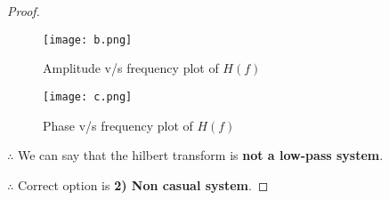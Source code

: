 \documentclass[journal,12pt,twocolumn]{IEEEtran}
\begin{document}
\begin{proof}
\begin{enumerate}
  \begin{figure}[!htp]
\centering
 \texttt{[image: b.png]}
 \caption{Amplitude v/s frequency plot of $H(f)$}
  \label{figx3}
 \end{figure}
 
  \begin{figure}[!htp]
\centering
 \texttt{[image: c.png]}
 \caption{Phase v/s frequency plot of $H(f)$}

 \end{figure}

\newpage
$\therefore$ We can say that the hilbert transform is \textbf{not a low-pass system}.
\end{enumerate}

$\therefore$ Correct option is \textbf{2) Non casual system}.
\end{proof}
\end{document}
